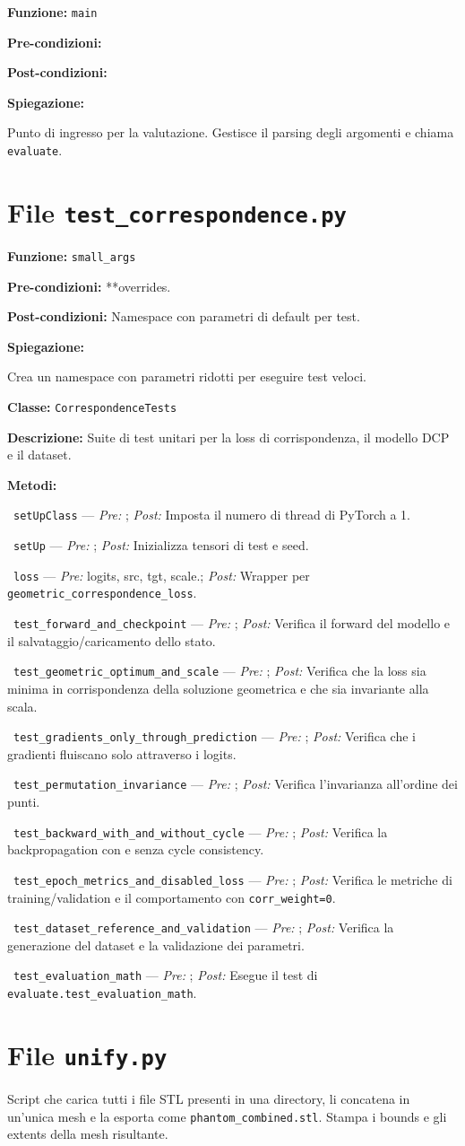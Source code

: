 \documentclass[11pt,a4paper]{article}
\newenvironment{functionspec}[3]{%
    \par\medskip\noindent
    \textbf{Funzione:} \texttt{#1}\par
    \textbf{Pre-condizioni:} #2\par
    \textbf{Post-condizioni:} #3\par
    \textbf{Spiegazione:}\par\noindent\ignorespaces
}{%
    \par\medskip
}
\newenvironment{classspec}[2]{%
    \par\medskip\noindent
    \textbf{Classe:} \texttt{#1}\par
    \textbf{Descrizione:} #2\par
    \textbf{Metodi:}\par
    \begingroup
    \setlength{\parindent}{0pt}%
    \setlength{\parskip}{2pt}%
}{%
    \endgroup
    \par\medskip
}
\newcommand{\method}[3]{%
    \noindent\hspace*{1.2em}\textbullet~\texttt{#1} --- \textit{Pre:} #2; \textit{Post:} #3\par
}
\begin{document}
\begin{functionspec}{main}{}{}
Punto di ingresso per la valutazione. Gestisce il parsing degli argomenti e chiama \texttt{evaluate}.
\end{functionspec}

\section{File \texttt{test\_correspondence.py}}

\begin{functionspec}{small\_args}{**overrides.}{Namespace con parametri di default per test.}
Crea un namespace con parametri ridotti per eseguire test veloci.
\end{functionspec}

\begin{classspec}{CorrespondenceTests}{Suite di test unitari per la loss di corrispondenza, il modello DCP e il dataset.}
\method{setUpClass}{}{Imposta il numero di thread di PyTorch a 1.}
\method{setUp}{}{Inizializza tensori di test e seed.}
\method{loss}{logits, src, tgt, scale.}{Wrapper per \texttt{geometric\_correspondence\_loss}.}
\method{test\_forward\_and\_checkpoint}{}{Verifica il forward del modello e il salvataggio/caricamento dello stato.}
\method{test\_geometric\_optimum\_and\_scale}{}{Verifica che la loss sia minima in corrispondenza della soluzione geometrica e che sia invariante alla scala.}
\method{test\_gradients\_only\_through\_prediction}{}{Verifica che i gradienti fluiscano solo attraverso i logits.}
\method{test\_permutation\_invariance}{}{Verifica l'invarianza all'ordine dei punti.}
\method{test\_backward\_with\_and\_without\_cycle}{}{Verifica la backpropagation con e senza cycle consistency.}
\method{test\_epoch\_metrics\_and\_disabled\_loss}{}{Verifica le metriche di training/validation e il comportamento con \texttt{corr\_weight=0}.}
\method{test\_dataset\_reference\_and\_validation}{}{Verifica la generazione del dataset e la validazione dei parametri.}
\method{test\_evaluation\_math}{}{Esegue il test di \texttt{evaluate.test\_evaluation\_math}.}
\end{classspec}

\section{File \texttt{unify.py}}

Script che carica tutti i file STL presenti in una directory, li concatena in un'unica mesh e la esporta come \texttt{phantom\_combined.stl}. Stampa i bounds e gli extents della mesh risultante.
\end{document}
